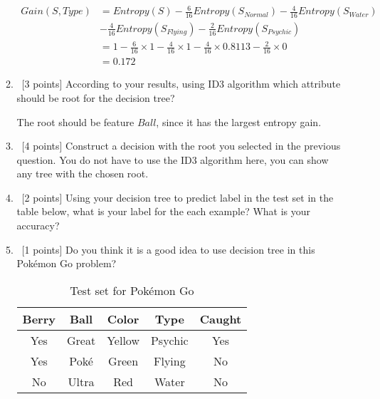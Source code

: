 \begin{enumerate}
\begin{enumerate}
\begin{align*}
\end{align*}
\begin{align*} 
Gain(S , Type) &= Entropy(S) - \frac{6}{16} Entropy(S_{Normal}) - \frac{4}{16} Entropy(S_{Water}) \\ 
&- \frac{4}{16} Entropy(S_{Flying}) - \frac{2}{16} Entropy(S_{Psychic})\\
&= 1 - \frac{6}{16} \times 1 - \frac{4}{16} \times 1 -\frac{4}{16} \times 0.8113 - \frac{2}{16} \times 0\\
&= 0.172
\end{align*}
\item  ~[3 points] According to your results, using ID3 algorithm which attribute should be root for the decision tree?

The root should be feature $Ball$, since it has the largest entropy gain.

\item   ~[4 points] Construct a decision with the root you selected in the previous question. You do not have to use the ID3 algorithm here, you can show any tree with the chosen root.
\item   ~[2 points] Using your decision tree to predict label in the test set in the table below, what is your label for the each example? What is your accuracy?

\item   ~[1 points]  Do you think it is a good idea to use decision tree in this Pok\'emon Go problem?

\begin{table}[H]
\centering
\begin{tabular}{| c c c c | c |}
\hline
Berry& Ball & Color & Type & Caught\\
\hline
Yes & Great & Yellow & Psychic & Yes \\
Yes & Pok\'e & Green & Flying & No \\
No & Ultra & Red & Water & No \\
\hline
\end{tabular}
\caption{Test set for Pok\'emon Go}
\end{table}



\end{enumerate}
\end{enumerate}
